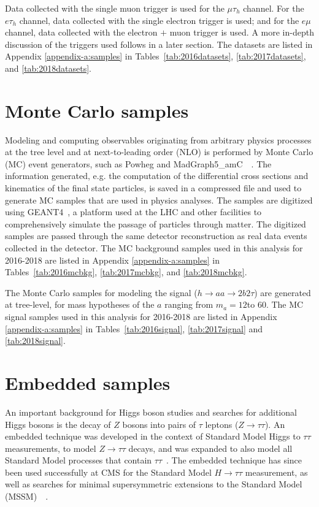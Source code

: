 Data collected with the single muon trigger is used for the $\mu\tau_{h}$ channel. For the $e\tau_{h}$ channel, data collected with the single electron trigger is used; and for the $e\mu$ channel, data collected with the electron $+$ muon trigger is used. A more in-depth discussion of the triggers used follows in a later section. The datasets are listed in Appendix \ref{appendix-a:samples} in Tables~\ref{tab:2016datasets}, \ref{tab:2017datasets}, and \ref{tab:2018datasets}.

\section{Monte Carlo samples}
\label{section:mc-samples}
Modeling and computing observables originating from arbitrary physics processes at the tree level and at next-to-leading order (NLO) is performed by Monte Carlo (MC) event generators, such as Powheg and MadGraph5\_amC\@NLO~\cite{Alwall_2014}~\cite{Frederix_2018}. The information generated, e.g. the computation of the differential cross sections and kinematics of the final state particles, is saved in a compressed file and used to generate MC samples that are used in physics analyses. The samples are digitized using GEANT4~\cite{agostinelli_geant4simulation_2003}, a platform used at the LHC and other facilities to comprehensively simulate the passage of particles through matter. The digitized samples are passed through the same detector reconstruction as real data events collected in the detector. The MC background samples used in this analysis for 2016-2018 are listed in Appendix \ref{appendix-a:samples} in Tables~\ref{tab:2016mcbkg}, \ref{tab:2017mcbkg}, and \ref{tab:2018mcbkg}.

The Monte Carlo samples for modeling the signal ($h \rightarrow aa \rightarrow 2b2\tau$) are generated at tree-level, for mass hypotheses of the $a$ ranging from $m_a = 12$\GeV to 60\GeV. The MC signal samples used in this analysis for 2016-2018 are listed in Appendix \ref{appendix-a:samples} in Tables~\ref{tab:2016signal}, \ref{tab:2017signal} and \ref{tab:2018signal}. 


\section{Embedded samples}
\label{section:embedded-samples}
An important background for Higgs boson studies and searches for additional Higgs bosons is the decay of $Z$ bosons into pairs of $\tau$ leptons ($Z \rightarrow \tau\tau$). An embedded technique was developed in the context of Standard Model Higgs to $\tau\tau$ measurements, to model $Z \rightarrow \tau\tau$ decays, and was expanded to also model all Standard Model processes that contain $\tau\tau$~\cite{CMS-TAU-18-001}. The embedded technique has since been used successfully at CMS for the Standard Model $H \rightarrow \tau\tau$ measurement, as well as searches for minimal supersymmetric extensions to the Standard Model (MSSM)~\cite{CMS-HIG-13-021}~\cite{CMS-HIG-19-010}. 


